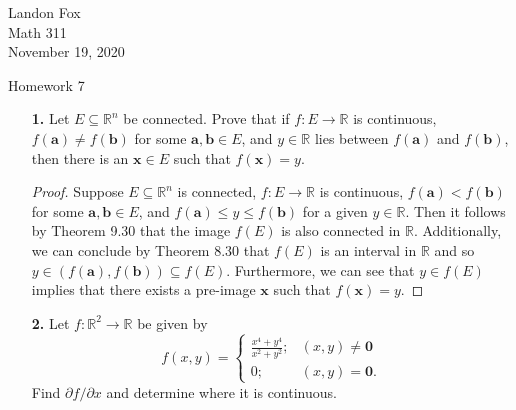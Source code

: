 \documentclass[ 12pt ]{article}
\begin{document}
\noindent Landon Fox \\
\noindent Math 311 \\
\noindent November 19, 2020

\begin{center}
	\Large Homework 7
\end{center}

\begin{enumerate}
	\item[\textbf{1.}] Let $E \subseteq \mathbb{R}^n$ be connected. Prove that if $f : E \to \mathbb{R}$ is continuous, $f( \textbf{a} ) \neq f( \textbf{b} )$ for some $\textbf{a},
		\textbf{b} \in E$, and $y \in \mathbb{R}$ lies between $f( \textbf{a} )$ and $f( \textbf{b} )$, then there is an $\textbf{x} \in E$ such that $f( \textbf{x} ) = y$.

		\begin{proof}
			Suppose $E \subseteq \mathbb{R}^n$ is connected, $f : E \to \mathbb{R}$ is continuous, $f( \textbf{a} ) < f( \textbf{b} )$ for some $\textbf{a}, \textbf{b} \in E$, and
			$f( \textbf{a} ) \leq y \leq f( \textbf{b} )$ for a given $y \in \mathbb{R}$. Then it follows by Theorem 9.30 that the image $f( E )$ is also connected in $\mathbb{R}$.
			Additionally, we can conclude by Theorem 8.30 that $f( E )$ is an interval in $\mathbb{R}$ and so $y \in ( f( \textbf{a} ), f( \textbf{b} ) ) \subseteq f( E )$. Furthermore,
			we can see that $y \in f( E )$ implies that there exists a pre-image $\textbf{x}$ such that $f( \textbf{x} ) = y$.
		\end{proof}


	\item[\textbf{2.}] Let $f : \mathbb{R}^2 \to \mathbb{R}$ be given by \[ f( x, y ) = \begin{cases} \frac{x^4 + y^4}{x^2 + y^2}; & (x, y) \neq \textbf{0} \\ 0; & (x, y) = \textbf{0}.
		\end{cases} \] Find $\partial f / \partial x$ and determine where it is continuous.


\end{enumerate}
\end{document}
